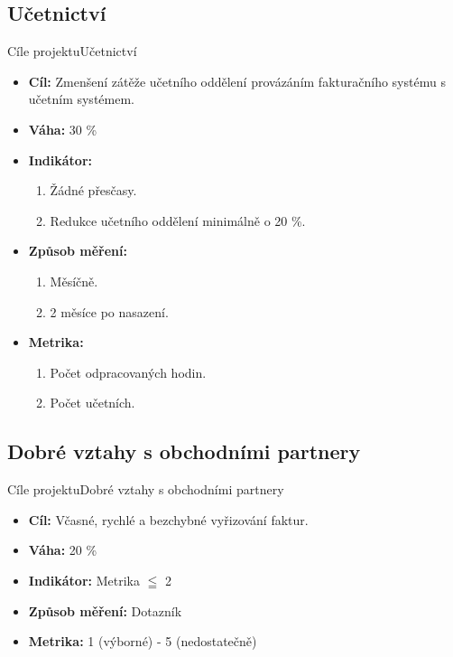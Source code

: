 \documentclass[10pt]{beamer}
\begin{document}
\subsection*{Učetnictví}

\begin{frame}{Cíle projektu}{Učetnictví}
	\begin{itemize}
		\item \textbf{Cíl:} Zmenšení zátěže učetního oddělení provázáním fakturačního systému s učetním systémem.
		\item \textbf{Váha:} 30 \%
		\item \textbf{Indikátor:} 
			\begin{enumerate}
				\item Žádné přesčasy.
				\item Redukce učetního oddělení minimálně o 20 \%.
			\end{enumerate}
		\item \textbf{Způsob měření:} 
			\begin{enumerate}
				\item Měsíčně.
				\item 2 měsíce po nasazení.
			\end{enumerate}
		\item \textbf{Metrika:}
			\begin{enumerate}
				\item Počet odpracovaných hodin.
				\item Počet učetních.
		\end{enumerate}
	\end{itemize}
\end{frame}

\subsection*{Dobré vztahy s obchodními partnery}

\begin{frame}{Cíle projektu}{Dobré vztahy s obchodními partnery}
	\begin{itemize}
		\item \textbf{Cíl:} Včasné, rychlé a bezchybné vyřizování faktur.
		\item \textbf{Váha:} 20 \%
		\item \textbf{Indikátor:} Metrika $\leqq$ 2
		\item \textbf{Způsob měření:} Dotazník
		\item \textbf{Metrika:} 1 (výborné) - 5 (nedostatečně)
	\end{itemize}
\end{frame}
\end{document}
